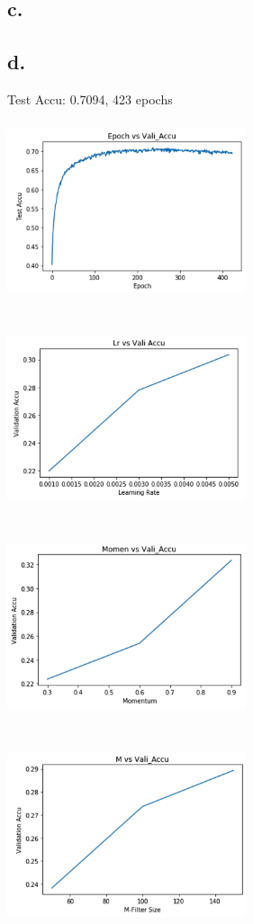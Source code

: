 \documentclass{article}
\begin{document}
\subsection*{c.}


\subsection*{d.}
Test Accu: 0.7094, 423 epochs \\
\includegraphics[width=7cm, height=6cm]{plots/A5d.png}
\includegraphics[width=7cm, height=6cm]{plots/A5d_1.png} \\
\includegraphics[width=7cm, height=6cm]{plots/A5d_2.png}
\includegraphics[width=7cm, height=6cm]{plots/A5d_3.png} \\
\end{document}
